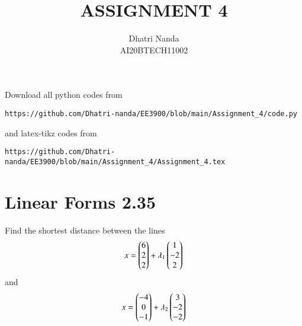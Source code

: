 \documentclass[journal,12pt,twocolumn]{IEEEtran}
\begin{document}
\let\vec\mathbf
\renewcommand{\thefigure}{\theproblem}
\def\putbox#1#2#3{\makebox[0in][l]{\makebox[#1][l]{}\raisebox{\baselineskip}[0in][0in]{\raisebox{#2}[0in][0in]{#3}}}}
     \def\rightbox#1{\makebox[0in][r]{#1}}
     \def\centbox#1{\makebox[0in]{#1}}
     \def\topbox#1{\raisebox{-\baselineskip}[0in][0in]{#1}}
     \def\midbox#1{\raisebox{-0.5\baselineskip}[0in][0in]{#1}}
\vspace{3cm}
\title{ASSIGNMENT 4}
\author{Dhatri Nanda \\ AI20BTECH11002}
\maketitle
\newpage
\bigskip
\renewcommand{\thefigure}{\theenumi}
\renewcommand{\thetable}{\theenumi}
Download all python codes from 
\begin{lstlisting}
https://github.com/Dhatri-nanda/EE3900/blob/main/Assignment_4/code.py
\end{lstlisting}
%
and latex-tikz codes from 
%
\begin{lstlisting}
https://github.com/Dhatri-nanda/EE3900/blob/main/Assignment_4/Assignment_4.tex
\end{lstlisting}
\section{Linear Forms 2.35}
Find the shortest distance between the lines
\begin{align}
    x = \begin{pmatrix}6\\2\\2\end{pmatrix} + \lambda_1\begin{pmatrix}1\\-2\\2\end{pmatrix}
\end{align}
and 
\begin{align}
    x = \begin{pmatrix}-4\\0\\-1\end{pmatrix} + \lambda_2\begin{pmatrix}3\\-2\\-2\end{pmatrix}
\end{align}
\end{document}
